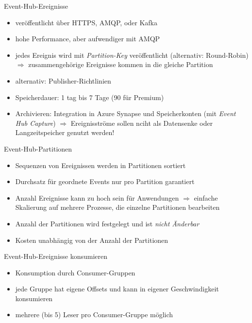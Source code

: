 \begin{flashcard}[]{Event-Hub-Ereignisse}
  \begin{itemize}
    \item veröffentlicht über HTTPS, AMQP, oder Kafka
    \item hohe Performance, aber aufwendiger mit AMQP
    \item jedes Ereignis wird mit \emph{Partition-Key} veröffentlicht (alternativ: Round-Robin)\newline
      $\Rightarrow$ zusammengehörige Ereignisse kommen in die gleiche Partition
    \item alternativ: Publisher-Richtlinien
    \item Speicherdauer: 1 tag bis 7 Tage (90 für Premium)
    \item Archivieren: Integration in Azure Synapse und Speicherkonten (mit \emph{Event Hub Capture})\newline
      $\Rightarrow$ Ereignisströme sollen nciht als Datensenke oder Langzeitspeicher genutzt werden!
  \end{itemize}
\end{flashcard}

\begin{flashcard}[]{Event-Hub-Partitionen}
  \begin{itemize}
    \item Sequenzen von Ereignissen werden in Partitionen sortiert
    \item Durchsatz für geordnete Events nur pro Partition garantiert
    \item Anzahl Ereignisse kann zu hoch sein für Anwendungen\newline
      $\Rightarrow$ einfache Skalierung auf mehrere Prozesse, die einzelne Partitionen bearbeiten
    \item Anzahl der Partitionen wird festgelegt und ist \emph{nicht Änderbar}
    \item Kosten unabhängig von der Anzahl der Partitionen
  \end{itemize}
\end{flashcard}

\begin{flashcard}[]{Event-Hub-Ereignisse konsumieren}
  \begin{itemize}
    \item Konsumption durch Consumer-Gruppen
    \item jede Gruppe hat eigene Offsets und kann in eigener Geschwindigkeit konsumieren
    \item mehrere (bis 5) Leser pro Consumer-Gruppe möglich
  \end{itemize}
\end{flashcard}



